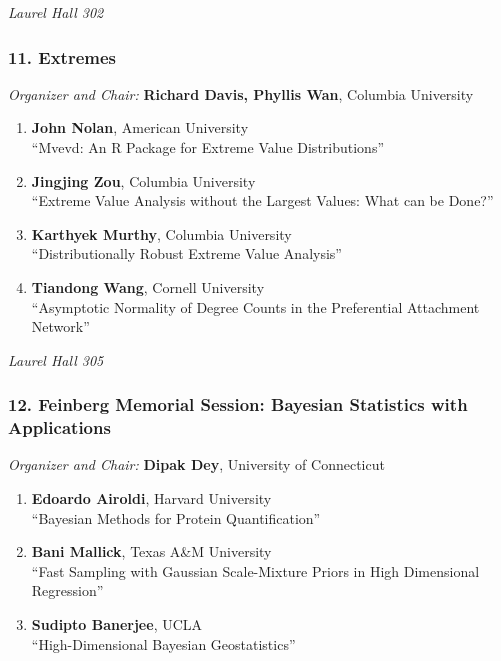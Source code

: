 \emph{Laurel Hall 302} \\[.5em]

\subsubsection*{11. Extremes}

\emph{Organizer and Chair:} \textbf{Richard Davis, Phyllis Wan}, Columbia University

\begin{enumerate}
\item \textbf{John Nolan}, American University \\
``Mvevd: An R Package for Extreme Value Distributions''
\item \textbf{Jingjing Zou}, Columbia University \\
``Extreme Value Analysis without the Largest Values: What can be Done?''
\item \textbf{Karthyek Murthy}, Columbia University \\
``Distributionally Robust Extreme Value Analysis''
\item \textbf{Tiandong Wang}, Cornell University \\
``Asymptotic Normality of Degree Counts in the Preferential Attachment Network''
\end{enumerate}

\emph{Laurel Hall 305} \\[.5em]

\subsubsection*{12. Feinberg Memorial Session: Bayesian Statistics with Applications}

\emph{Organizer and Chair:} \textbf{Dipak Dey}, University of Connecticut

\begin{enumerate}
\item \textbf{Edoardo Airoldi}, Harvard University \\
``Bayesian Methods for Protein Quantification''
\item \textbf{Bani Mallick}, Texas A\&M University \\
``Fast Sampling with Gaussian Scale-Mixture Priors in High Dimensional Regression''
\item \textbf{Sudipto Banerjee}, UCLA \\
``High-Dimensional Bayesian Geostatistics''
\end{enumerate}

